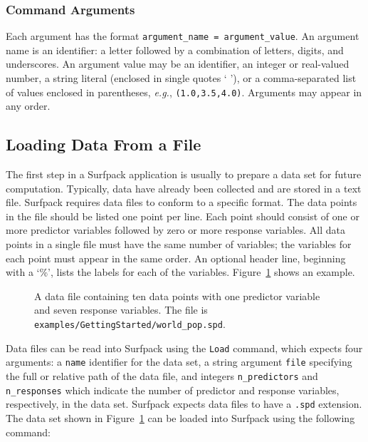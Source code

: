 \documentclass{article}
\begin{document}
\subsubsection{Command Arguments}\label{sec:arguments}

Each argument has the format \texttt{argument\_name =
argument\_value}.  An argument name is an identifier:  a letter followed by a
combination of letters, digits, and underscores.  An
argument value may be an identifier, an integer or
real-valued number, a string literal (enclosed in single quotes ` '), or a comma-separated list of values enclosed in parentheses,
{\em e.g.}, \texttt{(1.0,3.5,4.0)}.  Arguments may appear in any order.

\subsection{Loading Data From a File}\label{sec:loaddata}
The first step in a Surfpack application is usually to prepare a data set for
future computation.  Typically, data have already been collected and are stored in a text file.  Surfpack requires data files to conform to a specific format.  The data points in the file should be listed one point per line.  Each point should consist of one or more predictor variables followed by zero or more response variables.  All data points in a single file must have the same number of variables; the variables for each point must appear in the same order.  An optional header line, beginning with a `\%', lists the labels for each of the variables.  Figure~\ref{fig:world_population} shows an example.
\begin{figure}[htbp]
  \centering
  \begin{bigbox}
	\begin{small}
 	\end{small}
  \end{bigbox}
  \caption{A data file containing ten data points with one predictor variable and seven response variables.  The file is \texttt{examples/GettingStarted/world\_pop.spd}.}
   \label{fig:world_population}
\end{figure}

Data files can be read into Surfpack using the \texttt{Load} command, which expects four arguments: a \texttt{name} identifier for the data set, a string argument \texttt{file} specifying the full or relative path of the data file, and integers \texttt{n\_predictors} and \texttt{n\_responses} which indicate the number of predictor and response variables, respectively, in the data set.  Surfpack expects data files to have a \texttt{.spd} extension.  The data set shown in Figure~\ref{fig:world_population} can be loaded into Surfpack using the following command:
\end{document}
